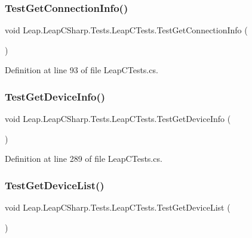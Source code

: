 \subsubsection{\texorpdfstring{TestGetConnectionInfo()}{TestGetConnectionInfo()}}
{\footnotesize\ttfamily void Leap.\+Leap\+C\+Sharp.\+Tests.\+Leap\+C\+Tests.\+Test\+Get\+Connection\+Info (\begin{DoxyParamCaption}{ }\end{DoxyParamCaption})}



Definition at line 93 of file Leap\+C\+Tests.\+cs.

\mbox{\label{class_leap_1_1_leap_c_sharp_1_1_tests_1_1_leap_c_tests_a0520368ee5402a8d1bfebd0724a81b38}} 
\subsubsection{\texorpdfstring{TestGetDeviceInfo()}{TestGetDeviceInfo()}}
{\footnotesize\ttfamily void Leap.\+Leap\+C\+Sharp.\+Tests.\+Leap\+C\+Tests.\+Test\+Get\+Device\+Info (\begin{DoxyParamCaption}{ }\end{DoxyParamCaption})}



Definition at line 289 of file Leap\+C\+Tests.\+cs.

\mbox{\label{class_leap_1_1_leap_c_sharp_1_1_tests_1_1_leap_c_tests_a231dd2df6f6166828c0ee88b63ee54ef}} 
\subsubsection{\texorpdfstring{TestGetDeviceList()}{TestGetDeviceList()}}
{\footnotesize\ttfamily void Leap.\+Leap\+C\+Sharp.\+Tests.\+Leap\+C\+Tests.\+Test\+Get\+Device\+List (\begin{DoxyParamCaption}{ }\end{DoxyParamCaption})}



